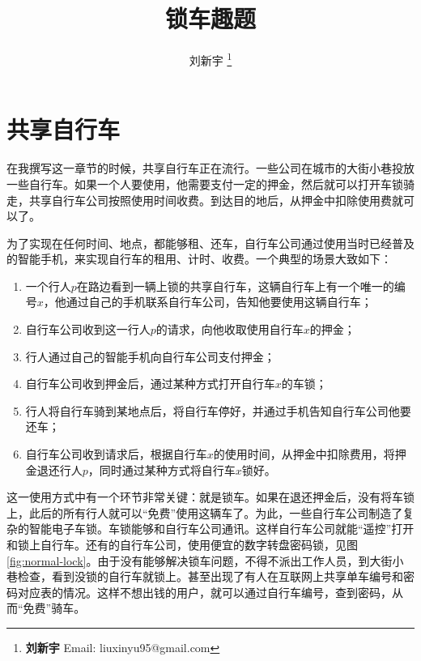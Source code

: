 \documentclass[UTF8]{article}
\begin{document}

\title{锁车趣题}

\author{刘新宇
\thanks{{\bfseries 刘新宇} \newline
  Email: liuxinyu95@gmail.com \newline}
  }

\maketitle
\fi


\section{共享自行车}

在我撰写这一章节的时候，共享自行车正在流行。一些公司在城市的大街小巷投放一些自行车。如果一个人要使用，他需要支付一定的押金，然后就可以打开车锁骑走，共享自行车公司按照使用时间收费。到达目的地后，从押金中扣除使用费就可以了。

为了实现在任何时间、地点，都能够租、还车，自行车公司通过使用当时已经普及的智能手机，来实现自行车的租用、计时、收费。一个典型的场景大致如下：

\begin{enumerate}
\item 一个行人$p$在路边看到一辆上锁的共享自行车，这辆自行车上有一个唯一的编号$x$，他通过自己的手机联系自行车公司，告知他要使用这辆自行车；
\item 自行车公司收到这一行人$p$的请求，向他收取使用自行车$x$的押金；
\item 行人通过自己的智能手机向自行车公司支付押金；
\item 自行车公司收到押金后，通过某种方式打开自行车$x$的车锁；
\item 行人将自行车骑到某地点后，将自行车停好，并通过手机告知自行车公司他要还车；
\item 自行车公司收到请求后，根据自行车$x$的使用时间，从押金中扣除费用，将押金退还行人$p$，同时通过某种方式将自行车$x$锁好。
\end{enumerate}

这一使用方式中有一个环节非常关键：就是锁车。如果在退还押金后，没有将车锁上，此后的所有行人就可以“免费”使用这辆车了。为此，一些自行车公司制造了复杂的智能电子车锁。车锁能够和自行车公司通讯。这样自行车公司就能“遥控”打开和锁上自行车。还有的自行车公司，使用便宜的数字转盘密码锁，见图\ref{fig:normal-lock}。由于没有能够解决锁车问题，不得不派出工作人员，到大街小巷检查，看到没锁的自行车就锁上。甚至出现了有人在互联网上共享单车编号和密码对应表的情况。这样不想出钱的用户，就可以通过自行车编号，查到密码，从而“免费”骑车。
\end{document}
